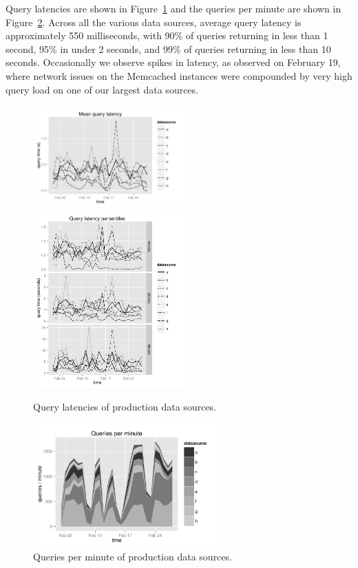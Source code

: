 \documentclass{vldb}
\begin{document}
Query latencies are shown in Figure~\ref{fig:query_latency} and the queries per
minute are shown in Figure~\ref{fig:queries_per_min}. Across all the various
data sources, average query latency is approximately 550 milliseconds, with
90\% of queries returning in less than 1 second, 95\% in under 2 seconds, and
99\% of queries returning in less than 10 seconds. Occasionally we observe
spikes in latency, as observed on February 19, where network issues on
the Memcached instances were compounded by very high query load on one of our
largest data sources.

\begin{figure}
\centering
\includegraphics[width = 2.3in]{avg_query_latency}
\includegraphics[width = 2.3in]{query_percentiles}
\caption{Query latencies of production data sources.}
\label{fig:query_latency}
\end{figure}

\begin{figure}
\centering
\includegraphics[width = 2.8in]{queries_per_min}
\caption{Queries per minute of production data sources.}
\label{fig:queries_per_min}
\end{figure}
\end{document}
